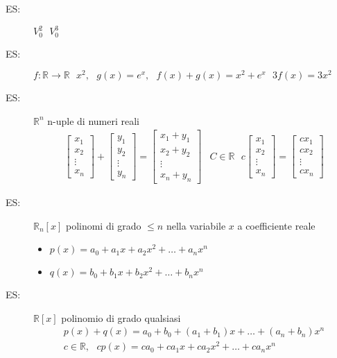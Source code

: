 \begin{description}
	\item[ES:] $V_0^2\text{ } V_0^3$
	\item[ES:] $f:\mathds{R}\to \mathds{R}\text{ } x^2, \text{ } g(x)=e^x, \text{ } f(x)+g(x)=x^2+e^x\text{ } 3f(x)=3x^2$
	\item[ES:] $\mathds{R}^n$ n-uple di numeri reali
	\[
	\begin{matrix}
		\begin{bmatrix}
			x_1\\
			x_2\\
			\vdots\\
			x_n
		\end{bmatrix}+\begin{bmatrix}
			y_1\\
			y_2\\
			\vdots\\
			y_n
		\end{bmatrix}=\begin{bmatrix}
			x_1+y_1\\
			x_2+y_2\\
			\vdots\\
			x_n+y_n
		\end{bmatrix}&C\in\mathds{R} \text{ } c\begin{bmatrix}
			x_1\\
			x_2\\
			\vdots\\
			x_n
		\end{bmatrix}=\begin{bmatrix}
			cx_1\\
			cx_2\\
			\vdots\\
			cx_n
		\end{bmatrix}
	\end{matrix}
	\]
	\item[ES:] $\mathds{R}_n[x]$ polinomi di grado $\leq n$ nella variabile $x$ a coefficiente reale
		\begin{itemize}
			\item $p(x)=a_0+a_1x+a_2x^2+\dots+a_nx^n$
			\item $q(x)=b_0+b_1x+b_2x^2+\dots+b_nx^n$
		\end{itemize}
	\item[ES:] $\mathds{R}[x]$ polinomio di grado qualsiasi
		\begin{equation*}
			\begin{matrix}
				p(x)+q(x)=a_0+b_0+(a_1+b_1)x+\dots+(a_n+b_n)x^n\\
				c\in\mathds{R},\text{ } cp(x)=ca_0+ca_1x+ca_2x^2+\dots+ca_nx^n
			\end{matrix}
		\end{equation*}
\end{description}